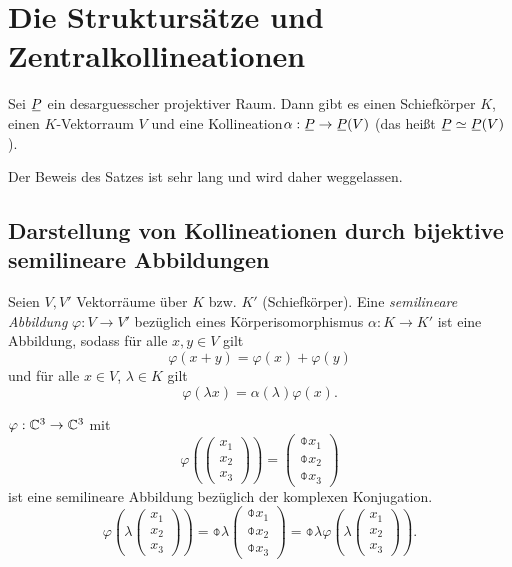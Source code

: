 \setcounter{secnumdepth}{1}
\section{Die Struktursätze und Zentralkollineationen}
\setcounter{secnumdepth}{0}

\begin{thm}
 Sei $\proj$ ein desarguesscher projektiver Raum. Dann gibt es einen Schiefkörper $K$, einen $K$-Vektorraum $V$ und eine Kollineation\footnotemark $\alpha: \proj \to \proj(V)$ (das heißt $\proj \simeq \proj(V)$). 
\end{thm}

Der Beweis des Satzes ist sehr lang und wird daher weggelassen.

\subsection{Darstellung von Kollineationen durch bijektive semilineare Abbildungen}
\begin{defn*}
 Seien $V, V'$ Vektorräume über $K$ bzw. $K'$ (Schiefkörper). Eine \emph{semilineare Abbildung} $\varphi: V \to V'$ bezüglich eines Körperisomorphismus $\alpha: K \to K'$ ist eine Abbildung, sodass für alle $x,y \in V$ gilt
 \[ \varphi(x+y) = \varphi(x) + \varphi(y) \]
 und für alle $x \in V$, $\lambda \in K$ gilt
 \[ \varphi( \lambda x ) = \alpha(\lambda) \varphi(x). \]
\end{defn*}

\begin{exmp*}
 $\varphi: \mathbb{C}^3 \to \mathbb{C}^3$ mit
 \[ \varphi\left( \begin{pmatrix} x_1 \\ x_2 \\ x_3 \end{pmatrix} \right) = \begin{pmatrix} \obar{x_1} \\ \obar{x_2} \\ \obar{x_3} \end{pmatrix} \]
 ist eine semilineare Abbildung bezüglich der komplexen Konjugation.
 \[ \varphi\left( \lambda \begin{pmatrix} x_1 \\ x_2 \\ x_3 \end{pmatrix} \right) = \obar{\lambda} \begin{pmatrix} \obar{x_1} \\ \obar{x_2} \\ \obar{x_3} \end{pmatrix} = \obar{\lambda} \varphi\left( \lambda \begin{pmatrix} x_1 \\ x_2 \\ x_3 \end{pmatrix} \right). \]
\end{exmp*}

